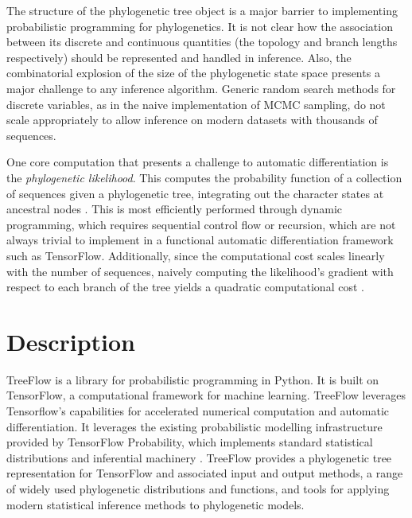 The structure of the phylogenetic tree object is a major barrier to implementing probabilistic programming for phylogenetics. It is not clear how the association between its discrete and continuous quantities (the topology and branch lengths respectively) should be represented and handled in inference. Also, the combinatorial explosion of the size of the phylogenetic state space presents a major challenge to any inference algorithm. Generic random search methods for discrete variables, as in the naive implementation of MCMC sampling, do not scale appropriately to allow inference on modern datasets with thousands of sequences.

One core computation that presents a challenge to automatic differentiation is the \textit{phylogenetic likelihood}. This computes the probability function of a collection of sequences given a phylogenetic tree, integrating out the character states at ancestral nodes \cite{felsenstein1981evolutionary}. This is most efficiently performed through dynamic programming, which requires sequential control flow or recursion, which are not always trivial to implement in a functional automatic differentiation framework such as TensorFlow. Additionally, since the computational cost scales linearly with the number of sequences, naively computing the likelihood's gradient with respect to each branch of the tree yields a quadratic computational cost \cite{ji2020gradients}.



\section{Description}

TreeFlow is a library for probabilistic programming in Python. It is built on TensorFlow, a computational framework for machine learning. TreeFlow leverages Tensorflow's capabilities for accelerated numerical computation and automatic differentiation. It leverages the existing probabilistic modelling infrastructure provided by TensorFlow Probability, which implements standard statistical distributions and inferential machinery \cite{dillon2017tensorflow}. TreeFlow provides a phylogenetic tree representation for TensorFlow and associated input and output methods, a range of widely used phylogenetic distributions and functions, and tools for applying modern statistical inference methods to phylogenetic models.

